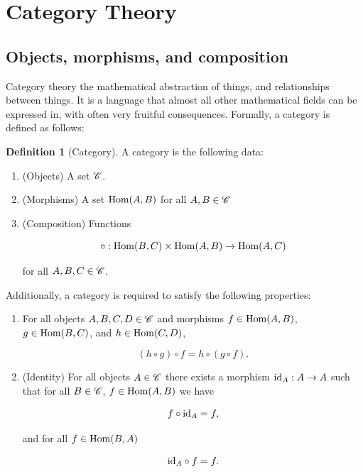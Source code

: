 \documentclass{article}
\theoremstyle{definition}
\newtheorem*{definition}{Definition}
\numberwithin{figure}{section}
\begin{document}
\section{Category Theory}
\label{Categories}

\subsection{Objects, morphisms, and composition}
\label{Objects}

Category theory the mathematical abstraction of things, and relationships between things. It is a language that almost all other mathematical fields can be expressed in, with often very fruitful consequences. Formally, a category is defined as follows:

\begin{definition}[Category] A category is the following data:

\begin{enumerate}
\item (Objects) A set $\mathscr{C}$.
\item (Morphisms) A set $\mathrm{Hom}(A,B)$ for all $A,B\in \mathscr{C}$
\item (Composition) Functions

$$\circ: \mathrm{Hom}(B,C)\times \mathrm{Hom}(A,B)\to \mathrm{Hom}(A,C)$$

for all $A,B,C\in \mathscr{C}$.
\end{enumerate}

Additionally, a category is required to satisfy the following properties:

\begin{enumerate}

\item For all objects $A,B,C,D\in \mathscr{C}$ and morphisms $f\in \mathrm{Hom}(A,B)$, $g\in \mathrm{Hom}(B,C)$, and $h\in\mathrm{Hom}(C,D)$,

$$(h\circ g)\circ f = h\circ (g\circ f).$$

\item (Identity) For all objects $A\in \mathscr{C}$ there exists a morphism $\mathrm{id}_{A}: A\to A$ such that for all $B\in \mathscr{C}$, $f\in \mathrm{Hom}(A,B)$ we have

$$f\circ \mathrm{id}_{A}=f,$$

and for all $f\in \mathrm{Hom}(B,A)$

$$\mathrm{id}_{A}\circ f = f.$$

\end{enumerate}

\raggedleft\qedsymbol{}
\end{definition}
\end{document}
